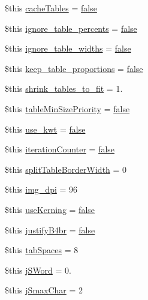\begin{DoxyCompactItemize}
\$this \hyperlink{config_8php_a8cc2276fbb1a71fc15a2f7c62a56bb34}{cache\-Tables} = \hyperlink{ttfontsuni_8php_afbaa04e5cc97693dc668b3c45d3dd740}{false}
\item 
\$this \hyperlink{config_8php_a134c79434db6fc7c394867d9464828ec}{ignore\-\_\-table\-\_\-percents} = \hyperlink{ttfontsuni_8php_afbaa04e5cc97693dc668b3c45d3dd740}{false}
\item 
\$this \hyperlink{config_8php_af52ac00a7b5e1e81ed7c7ab2e87e6dd4}{ignore\-\_\-table\-\_\-widths} = \hyperlink{ttfontsuni_8php_afbaa04e5cc97693dc668b3c45d3dd740}{false}
\item 
\$this \hyperlink{config_8php_ac52437a9c272ea633aaefcd6f27e0dcc}{keep\-\_\-table\-\_\-proportions} = \hyperlink{ttfontsuni_8php_afbaa04e5cc97693dc668b3c45d3dd740}{false}
\item 
\$this \hyperlink{config_8php_a74d8a58f2cd94f0d19d9b4a1a8f946cf}{shrink\-\_\-tables\-\_\-to\-\_\-fit} = 1.
\item 
\$this \hyperlink{config_8php_a05dcfe20b5f534fd91ef08f53e5b4e4e}{table\-Min\-Size\-Priority} = \hyperlink{ttfontsuni_8php_afbaa04e5cc97693dc668b3c45d3dd740}{false}
\item 
\$this \hyperlink{config_8php_a80ec406008a5b3b8d361a17a936b4ace}{use\-\_\-kwt} = \hyperlink{ttfontsuni_8php_afbaa04e5cc97693dc668b3c45d3dd740}{false}
\item 
\$this \hyperlink{config_8php_a8efcd7889bdb2ee6616ad96e937d1fb8}{iteration\-Counter} = \hyperlink{ttfontsuni_8php_afbaa04e5cc97693dc668b3c45d3dd740}{false}
\item 
\$this \hyperlink{config_8php_ae64dbc8f53f7cf4c58f7ad2b5dde6d50}{split\-Table\-Border\-Width} = 0
\item 
\$this \hyperlink{config_8php_a385982a1af7184091c58976ccae42518}{img\-\_\-dpi} = 96
\item 
\$this \hyperlink{config_8php_a6de601bb5dd0f7aa61d8e97149276fee}{use\-Kerning} = \hyperlink{ttfontsuni_8php_afbaa04e5cc97693dc668b3c45d3dd740}{false}
\item 
\$this \hyperlink{config_8php_a8ecebea6205147353d33a9e945d39ebd}{justify\-B4br} = \hyperlink{ttfontsuni_8php_afbaa04e5cc97693dc668b3c45d3dd740}{false}
\item 
\$this \hyperlink{config_8php_a8e51791a1b14963fb57535f1832126b8}{tab\-Spaces} = 8
\item 
\$this \hyperlink{config_8php_aa76c1542a6a06552e112e7c9e63ef8eb}{j\-S\-Word} = 0.
\item 
\$this \hyperlink{config_8php_adbe88fd58b98ddbc5784838af76215ff}{j\-Smax\-Char} = 2

\end{DoxyCompactItemize}
